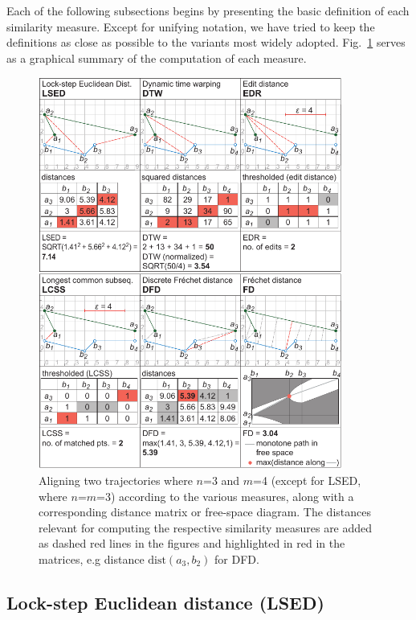 \documentclass{interact}
\newcommand{\dist}{\ensuremath{\text{dist}}}
\begin{document}
Each of the following subsections begins by presenting the basic definition of each similarity measure. Except for unifying notation, we have tried to keep the definitions as close as possible to the variants most widely adopted. Fig.~\ref{fig:Traj_align} serves as a graphical summary of the computation of each measure.%

\begin{figure}[htb]
\centering
\includegraphics[width=100mm]{figures/Fig2}
\caption{Aligning two trajectories where $n$=3 and $m$=4 (except for LSED, where $n$=$m$=3) according to the various measures, along with a corresponding distance matrix or free-space diagram. The distances relevant for computing the respective similarity measures are added as dashed red lines in the figures and highlighted in red in the matrices, e.g distance $\dist(a_3,b_2)$ for DFD.}\label{fig:Traj_align}
\end{figure}

\subsection{Lock-step Euclidean distance (LSED)}

\end{document}
